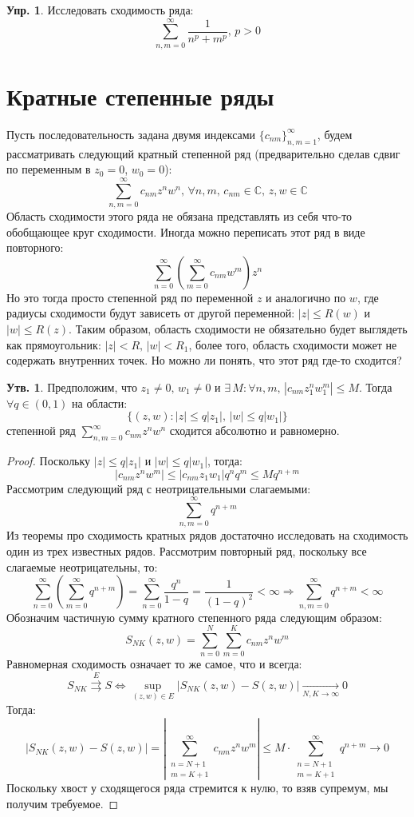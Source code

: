 \documentclass[12pt]{article}
\newcommand{\MC}{\mathbb{C}}
\theoremstyle{definition}
\newtheorem{prop}{Утв.}
\newtheorem{exrc}{Упр.}
\newcommand{\ddsum}[2]{\displaystyle\sum\limits_{#1}^{#2}}
\newcommand{\uconv}[1]{\overset{#1}{\rightrightarrows}}
\begin{document}
\begin{exrc}
	Исследовать сходимость ряда:
	$$
		\ddsum{n,m = 0}{\infty}\dfrac{1}{n^p + m^p}, \, p > 0
	$$
\end{exrc}

\newpage
\section*{Кратные степенные ряды}
Пусть последовательность задана двумя индексами $\{c_{nm}\}_{n,m = 1}^{\infty}$, будем рассматривать следующий кратный степенной ряд (предварительно сделав сдвиг по переменным в $z_0 = 0$, $w_0 = 0$):
$$
	\ddsum{n,m = 0}{\infty}c_{nm}z^n w^n, \, \forall n,m, \, c_{nm} \in \MC,\, z,w \in \MC
$$
Область сходимости этого ряда не обязана представлять из себя что-то обобщающее круг сходимости. Иногда можно переписать этот ряд в виде повторного:
$$
	\ddsum{n = 0}{\infty}\left(\ddsum{m = 0}{\infty}c_{nm}w^m\right)z^n
$$
Но это тогда просто степенной ряд по переменной $z$ и аналогично по $w$, где радиусы сходимости будут зависеть от другой переменной: $|z| \leq R(w)$ и $|w| \leq R(z)$. Таким образом, область сходимости не обязательно будет выглядеть как прямоугольник: $|z| < R, \, |w| < R_1$, более того, область сходимости может не содержать внутренних точек. Но можно ли понять, что этот ряд где-то сходится?
\begin{prop}
	Предположим, что $z_1 \neq 0, \, w_1 \neq 0$ и $\exists \, M \colon \forall n,m, \, |c_{nm}z_1^n w_1^m| \leq M$. Тогда $\forall q \in (0,1)$ на области:
	$$
		\{(z,w)\colon |z| \leq q|z_1|, \, |w| \leq q|w_1|\}
	$$
	степенной ряд $\ddsum{n,m = 0}{\infty}c_{nm}z^n w^n$ сходится абсолютно и равномерно.
\end{prop}
\begin{proof}
	Поскольку $|z| \leq q|z_1|$ и $|w| \leq q|w_1|$, тогда:
	$$
		|c_{nm}z^n w^m| \leq |c_{nm}z_1 w_1|q^n q^m \leq M q^{n + m}
	$$
	Рассмотрим следующий ряд с неотрицательными слагаемыми:
	$$
		\ddsum{n,m = 0}{\infty}q^{n+m}
	$$
	Из теоремы про сходимость кратных рядов достаточно исследовать на сходимость один из трех известных рядов. Рассмотрим повторный ряд, поскольку все слагаемые неотрицательны, то:
	$$
		\ddsum{n = 0}{\infty}\left(\ddsum{m = 0}{\infty}q^{n + m}\right) = \ddsum{ n = 0}{\infty}\dfrac{q^n}{1-q} = \dfrac{1}{(1-q)^2} < \infty \Rightarrow \ddsum{n,m = 0}{\infty}q^{n+m} < \infty 
	$$
	Обозначим частичную сумму кратного степенного ряда следующим образом:
	$$
		S_{NK}(z,w) = \ddsum{n = 0}{N}\ddsum{m = 0}{K}c_{nm}z^n w^m
	$$
	Равномерная сходимость означает то же самое, что и всегда:
	$$
		S_{NK} \uconv{E} S \Leftrightarrow \sup\limits_{(z,w) \in E}\left|S_{NK}(z,w) - S(z,w)\right| \xrightarrow[N,K \to \infty]{} 0
	$$
	Тогда:
	$$
		\left|S_{NK}(z,w) - S(z,w)\right| = \left|\ddsum{\substack{n = N + 1 \\ m  = K + 1}}{\infty} c_{nm}z^n w^m \right| \leq M{\cdot}\ddsum{\substack{n = N + 1 \\ m  = K + 1}}{\infty}q^{n + m} \to 0
	$$
	Поскольку хвост у сходящегося ряда стремится к нулю, то взяв супремум, мы получим требуемое.
\end{proof}
\end{document}
